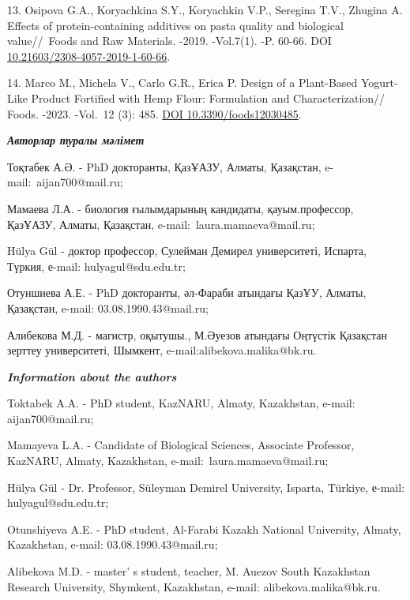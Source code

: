 \begin{refs}
13. Osipova G.A., Koryachkina S.Y., Koryachkin V.P., Seregina T.V.,
Zhugina A. Effects of protein-containing additives on pasta quality and
biological value//~Foods and Raw Materials. -2019. -Vol.7(1). -P.
60-66. DOI
\href{http://doi.org/10.21603/2308-4057-2019-1-60-66}{10.21603/2308-4057-2019-1-60-66}.

14. Marco M., Michela V., Carlo G.R., Erica P. Design of a Plant-Based
Yogurt-Like Product Fortified with Hemp Flour: Formulation and
Characterization// Foods. -2023. -Vol.~12 (3): 485.
\href{https://doi.org/10.3390/foods12030485}{DOI 10.3390/foods12030485}.
\end{refs}

\begin{info}
\hspace{1em}\emph{{\bfseries Авторлар туралы мәлімет}}

Тоқтабек А.Ә. - PhD докторанты, ҚазҰАЗУ, Алматы, Қазақстан,
e-mail:~aijan700@mail.ru;

Мамаева Л.А. - биология ғылымдарының кандидаты, қауым.профессор,
ҚазҰАЗУ, Алматы, Қазақстан, e-mail:~laura.mamaeva@mail.ru;

Hülya Gül - доктор профессор, Сулейман Демирел университеті, Испарта,
Түркия, е-mail: hulyagul@sdu.edu.tr;

Отуншиева А.Е. - PhD докторанты, әл-Фараби атындағы ҚазҰУ,
Алматы, Қазақстан, e-mail: 03.08.1990.43@mail.ru;

Алибекова М.Д. - магистр, оқытушы., М.Әуезов атындағы Оңтүстік
Қазақстан зерттеу университеті, Шымкент, e-mail:alibekova.malika@bk.ru.

\hspace{1em}\emph{{\bfseries Information about the authors}}

Toktabek A.A. - PhD student, KazNARU, Almaty, Kazakhstan, e-mail:
aijan700@mail.ru;

Mamayeva L.A. - Candidate of Biological Sciences, Associate Professor,
KazNARU, Almaty, Kazakhstan, e-mail:~laura.mamaeva@mail.ru;

Hülya Gül - Dr. Professor, Süleyman Demirel University, Isparta,
Türkiye, е-mail: hulyagul@sdu.edu.tr;

Otunshiyeva A.E. - PhD student, Al-Farabi Kazakh National
University, Almaty, Kazakhstan, e-mail: 03.08.1990.43@mail.ru;

Alibekova M.D. - master' s student, teacher, M. Auezov
South Kazakhstan Research University, Shymkent, Kazakhstan, e-mail:
alibekova.malika@bk.ru.
\end{info}
